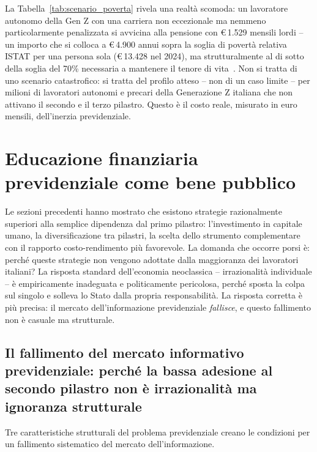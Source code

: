 La Tabella~\ref{tab:scenario_poverta} rivela una realtà scomoda: un
lavoratore autonomo della Gen Z con una carriera non eccezionale ma nemmeno
particolarmente penalizzata si avvicina alla pensione con \euro\,1.529
mensili lordi -- un importo che si colloca a \euro\,4.900 annui sopra la
soglia di povertà relativa ISTAT per una persona sola (\euro\,13.428 nel
2024), ma strutturalmente al di sotto della soglia del 70\% necessaria a
mantenere il tenore di vita~\cite{ISTAT2024, Bosi2018}. Non si tratta di
uno scenario catastrofico: si tratta del profilo atteso -- non di un caso
limite -- per milioni di lavoratori autonomi e precari della Generazione Z
italiana che non attivano il secondo e il terzo pilastro. Questo è il costo
reale, misurato in euro mensili, dell'inerzia previdenziale.

\section{Educazione finanziaria previdenziale come bene pubblico}
\label{sec:educazione_finanziaria}

Le sezioni precedenti hanno mostrato che esistono strategie razionalmente
superiori alla semplice dipendenza dal primo pilastro: l'investimento in
capitale umano, la diversificazione tra pilastri, la scelta dello strumento
complementare con il rapporto costo-rendimento più favorevole. La domanda
che occorre porsi è: perché queste strategie non vengono adottate dalla
maggioranza dei lavoratori italiani? La risposta standard dell'economia
neoclassica -- irrazionalità individuale -- è empiricamente inadeguata e
politicamente pericolosa, perché sposta la colpa sul singolo e solleva
lo Stato dalla propria responsabilità. La risposta corretta è più precisa:
il mercato dell'informazione previdenziale \emph{fallisce}, e questo
fallimento non è casuale ma strutturale.

\subsection{Il fallimento del mercato informativo previdenziale:
            perché la bassa adesione al secondo pilastro
            non è irrazionalità ma ignoranza strutturale}
\label{subsec:fallimento_informativo}

Tre caratteristiche strutturali del problema previdenziale creano le
condizioni per un fallimento sistematico del mercato dell'informazione.

